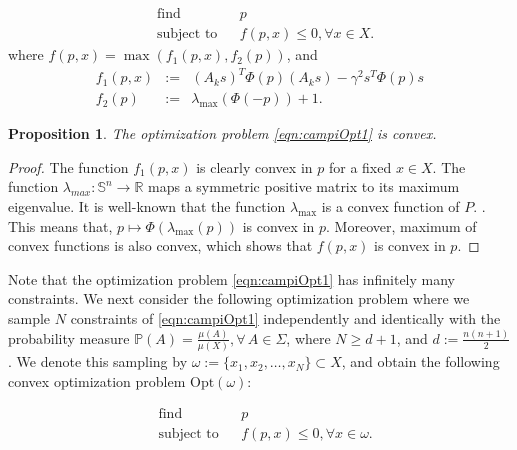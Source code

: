 \documentclass[letterpaper, 10 pt, conference]{ieeeconf}  %
\newcommand{\R}{\mathbb{R} }
\newcommand{\Opt}{\text{Opt} }
\newtheorem{proposition}[theorem]{Proposition}
\begin{document}
\begin{equation}
\label{eqn:campiOpt1}
\begin{aligned}
& \text{find} & & p \\
& \text{subject to} 
& & f(p,x) \leq 0, \forall x \in X.
\end{aligned}
\end{equation}
where $f(p,x) = \max(f_1(p, x), f_2(p))$, and 
\begin{eqnarray*}
f_1(p,x) &:=& (A_ks)^T\Phi(p)(A_ks) - \gamma^2 s^T\Phi(p)s \\
f_2(p) &:=& \lambda_{\max}(\Phi(-p)) +1.
\end{eqnarray*}


\begin{proposition}The optimization problem \eqref{eqn:campiOpt1} is convex.
\end{proposition}

\begin{proof}The function $f_1(p,x)$ is clearly convex in $p$ for a fixed $x \in X$. The function 
$\lambda_{max}: \mathbb{S}^n \to \R$ maps a symmetric positive matrix to its maximum eigenvalue. It is well-known that the function $\lambda_{\max}$ is a convex function of $P$. \cite{boyd}. This means that, $p \mapsto \Phi(\lambda_{\max}(p))$ is convex in $p$. Moreover, maximum of convex functions is also convex, which shows that $f(p, x)$ is convex in $p$.
\end{proof}

Note that the optimization problem \eqref{eqn:campiOpt1} has infinitely many constraints. We next consider the following optimization problem where we sample $N$ constraints of \eqref{eqn:campiOpt1} independently and identically with the probability measure
$\mathbb{P}(A) = \frac{\mu(A)}{\mu(X)}, \forall\, A \in \Sigma$, where $N \geq d+1$, and $d := \frac{n(n+1)}{2}$. We denote this sampling by $\omega:=\{x_1, x_2, \ldots, x_N\} \subset X$, and obtain the following convex optimization problem $\Opt(\omega)$: 

\begin{equation}
\label{eqn:campiOpt2}
\begin{aligned}
& \text{find} & & p \\
& \text{subject to} 
& & f(p, x) \leq 0, \forall x \in \omega. \end{aligned}
\end{equation}
\end{document}
